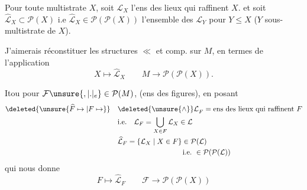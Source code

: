  Pour toute multistrate $X$, soit $\mathcal{L}_X$  l'ens des lieux qui raffinent $X$.
et soit $\widehat{\mathcal{L}}_X\subset\mathcal P(X)$ i.e $\widehat{\mathcal{L}}_X\in\mathcal P(\mathcal P(X))$ l'ensemble des  $\mathcal{L}_Y$ pour $Y\leq X$ ($Y$ sous-multistrate de $X$).  

J'aimerais réconstituer les structures $\ll$ et comp. sur $M$, en termes de l'application
\[
 X\longmapsto\widehat{\mathcal{L}}_X\qquad M\longrightarrow\mathcal P(\mathcal P(X)).
\]

 Itou pour $\mathcal F\unsure{,|.|{}_{e}}\in\mathcal P(M)$, (ens des figures), en posant
\[
\begin{aligned}
\deleted{\unsure{\widehat F\mapsto|F\mapsto}}\quad &{\deleted{\unsure{\wedge}}\mathcal{L}}_F=\text{ens des lieux qui raffinent }F\\
 &\text{i.e.}\quad \mathcal{L}_F=\bigcup_{X\in F}\mathcal{L}_X\in \mathcal{L}\\
 &\widehat{\mathcal{L}}_F=\{\mathcal{L}_X\mid X\in F\}\in\mathcal P(\mathcal{L})\\
 &\hspace{9em}\text{i.e.}\ \in\mathcal P(\mathcal P(\mathcal{L}))
\end{aligned}
\]
qui nous donne
\[
 F\longmapsto\widehat{\mathcal{L}}_F\qquad \mathcal F\longrightarrow\mathcal P(\mathcal P(X))
\]

 

